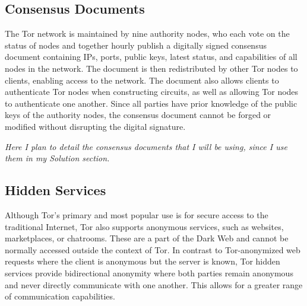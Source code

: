 %
%









\subsection{Consensus Documents}
\label{sec:ConsensusDocs}

The Tor network is maintained by nine authority nodes, who each vote on the status of nodes and together hourly publish a digitally signed consensus document containing IPs, ports, public keys, latest status, and capabilities of all nodes in the network. The document is then redistributed by other Tor nodes to clients, enabling access to the network. The document also allows clients to authenticate Tor nodes when constructing circuits, as well as allowing Tor nodes to authenticate one another. Since all parties have prior knowledge of the public keys of the authority nodes, the consensus document cannot be forged or modified without disrupting the digital signature.\cite{xin2009design}

\emph{Here I plan to detail the consensus documents that I will be using, since I use them in my Solution section.}

\subsection{Hidden Services}
\label{sec:HiddenServices}

Although Tor's primary and most popular use is for secure access to the traditional Internet, Tor also supports anonymous services, such as websites, marketplaces, or chatrooms. These are a part of the Dark Web and cannot be normally accessed outside the context of Tor. In contrast to Tor-anonymized web requests where the client is anonymous but the server is known, Tor hidden services provide bidirectional anonymity where both parties remain anonymous and never directly communicate with one another. This allows for a greater range of communication capabilities.\cite{nicolussi2011human}

